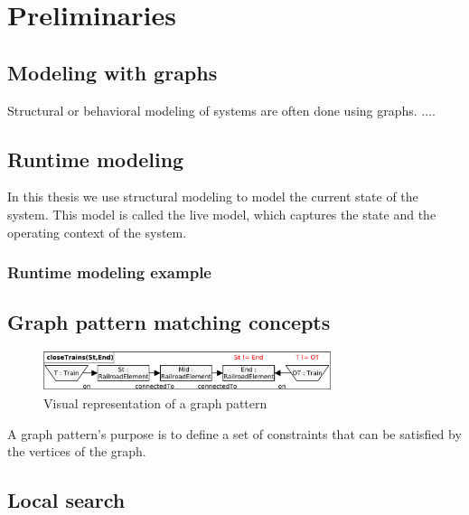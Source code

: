 
\chapter{Preliminaries}



\section{Modeling with graphs}

Structural or behavioral modeling of systems are often done using graphs. .... 

\section{Runtime modeling}

In this thesis we use structural modeling to model the current state of the system. This model is called the live model, which captures the state and the operating context of the system.

\subsection{Runtime modeling example}



\section{Graph pattern matching concepts}

\begin{figure}[h]
	\begin{center}
		\includegraphics[width=0.75\textwidth]{figures/pattern-visual.pdf}
		\caption{Visual representation of a graph pattern}
		\label{pattern-visual}
	\end{center}
\end{figure}

A graph pattern's purpose is to define a set of constraints that can be satisfied by the vertices of the graph.

\section{Local search}

